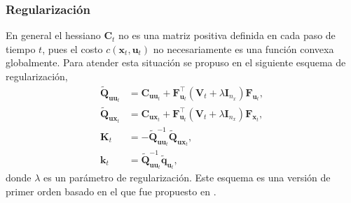 \subsubsection{Regularización} 
En general el hessiano $\mathbf{C}_t$ no es una matriz positiva definida en cada paso de tiempo $t$, pues el costo $c(\mathbf{x}_t, \mathbf{u}_t)$ no necesariamente es una función convexa globalmente. Para atender esta situación se propuso en \cite{ilqr2019} el siguiente esquema de regularización, 
\begin{align}
    \tilde{\mathbf{Q}}_{\mathbf{uu}_t} &= \mathbf{C}_{\mathbf{uu}_t} + \mathbf{F}_{\mathbf{u}_t}^{\top}(\mathbf{V}_t + \lambda \mathbf{I}_{n_x})
    \mathbf{F}_{\mathbf{u}_t}, \\
    \tilde{\mathbf{Q}}_{\mathbf{ux}_t} &= 
    \mathbf{C}_{\mathbf{ux}_t} + \mathbf{F}_{\mathbf{u}_t}^{\top}(\mathbf{V}_t + \lambda \mathbf{I}_{n_x})
    \mathbf{F}_{\mathbf{x}_t}, \\
    \mathbf{K}_{t} &= -\tilde{\mathbf{Q}}_{\mathbf{uu}_t}^{-1}\tilde{\mathbf{Q}}_{\mathbf{ux}_t}, \\
    \mathbf{k}_{t} &= \tilde{\mathbf{Q}}_{\mathbf{uu}_t}^{-1} \tilde{\mathbf{q}}_{\mathbf{u}_t}, 
\end{align}
donde $\lambda$ es un parámetro de regularización. Este esquema es una versión de primer orden basado en el que fue propuesto en \cite{Tassa2012}. 

